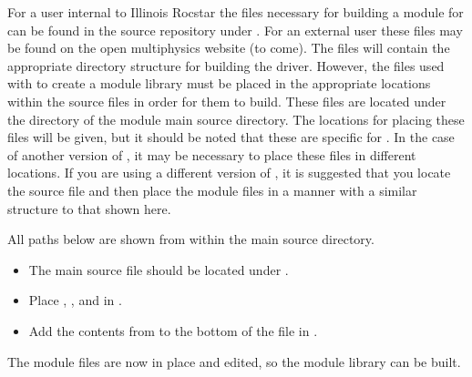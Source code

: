 
For a user internal to Illinois Rocstar the files necessary for building a module for \elmer can be found in the source repository under . For an external user these files may be found on the open multiphysics website (to come). The files will contain the appropriate directory structure for building the driver. However, the files used with \elmer to create a module library must be placed in the appropriate locations within the \elmer source files in order for them to build. These files are located under the  directory of the module main source directory. The locations for placing these files will be given, but it should be noted that these are specific for \elmer {}. In the case of another version of \elmer\!\!, it may be necessary to place these files in different locations. If you are using a different version of \elmer\!\!, it is suggested that you locate the source file  and then place the module files in a manner with a similar structure to that shown here. 

All paths below are shown from within the \elmer main source directory.

\begin{itemize}
\item The main source file  should be located under .
\item Place , , and  in .
\item Add the contents from  to the bottom of the  file in .
\end{itemize}

The module files are now in place and  edited, so the module library can be built.

